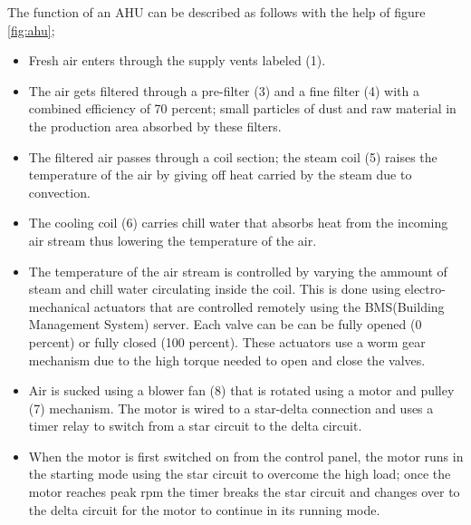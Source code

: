 \documentclass[a4paper,12pt]{article}
\begin{document}
		\vspace{0.4cm}
		
		The function of an AHU can be described as follows with the help of figure \ref{fig:ahu};
				
			\begin{itemize}
				\item Fresh air enters through the supply vents labeled (1).
				\item The air gets filtered through a pre-filter (3) and a fine filter (4) with a combined efficiency of 70 percent; small particles of dust and raw material in the production area absorbed by these filters.
				\item The filtered air passes through a coil section; the steam coil (5) raises the temperature of the air by giving off heat carried by the steam due to convection.
				\item The cooling coil (6) carries chill water that absorbs heat from the incoming air stream thus lowering the temperature of the air.
				\item The temperature of the air stream is controlled by varying the ammount of steam and chill water circulating inside the coil.
				This is done using electro-mechanical actuators that are controlled remotely using the BMS(Building Management System) server.
				Each valve can be can be fully opened (0 percent) or fully closed (100 percent). These actuators use a worm gear mechanism due to the high torque needed to open and close the valves.
				\item Air is sucked using a blower fan (8) that is rotated using a motor and pulley (7) mechanism. The motor is wired to a star-delta connection and uses a timer relay to switch from a star circuit to the delta circuit.
				\item When the motor is first switched on from the control panel, the motor runs in the starting mode using the star circuit to overcome the high load; once the motor reaches peak rpm the timer breaks the star circuit and changes over to the delta circuit for the motor to continue in its running mode.
				

\end{itemize}
\end{document}
